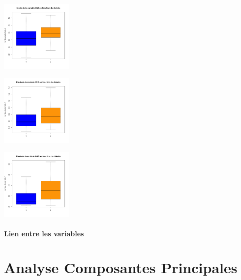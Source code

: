 \documentclass[]{report}
\begin{document}
\begin{center}
\begin{minipage}[t]{0.3\textwidth}
	\end{minipage}
	\begin{minipage}[t]{0.3\textwidth}
		\includegraphics[width=35mm]{Figures/Pima/bxp_z_bmi.png}
	\end{minipage}
	\newline
	\begin{minipage}[t]{0.3\textwidth}
		\includegraphics[width=35mm]{Figures/Pima/bxp_z_ped.png}
	\end{minipage}
	\begin{minipage}[t]{0.3\textwidth}
		\includegraphics[width=35mm]{Figures/Pima/bxp_z_age.png}
	\end{minipage}
\end{center}

\subsubsection{Lien entre les variables}


\chapter{Analyse Composantes Principales}
\end{document}
